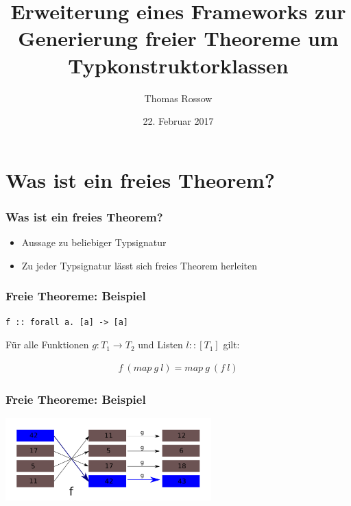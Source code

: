 \documentclass{beamer}
\title{Erweiterung eines Frameworks zur Generierung freier Theoreme um Typkonstruktorklassen}
\author{Thomas Rossow}
\date{22. Februar 2017}
\begin{document}
\maketitle
\frame{\tableofcontents}

\section{Was ist ein freies Theorem?}

\begin{frame}
\frametitle{Was ist ein freies Theorem?}

\begin{itemize}
\item Aussage zu beliebiger Typsignatur
\item Zu jeder Typsignatur lässt sich freies Theorem herleiten
\end{itemize}
\end{frame}


\begin{frame}[fragile]
\frametitle{Freie Theoreme: Beispiel}
\begin{verbatim}
f :: forall a. [a] -> [a]
\end{verbatim}

Für alle Funktionen $g : T_1 \rightarrow T_2$ und Listen $l :: [T_1]$ gilt:

\begin{align*}
f\ (map\ g\ l) = map\ g\ (f\ l)
\end{align*}
\end{frame}


\begin{frame}
\frametitle{Freie Theoreme: Beispiel}

\begin{center}
\includegraphics[width=300px]{fmapg}
\end{center}

\end{frame}
\end{document}
